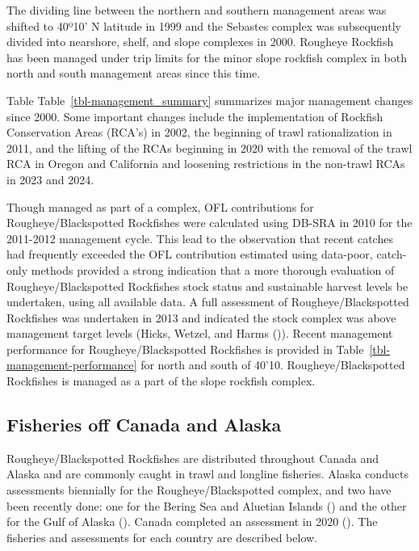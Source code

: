 \documentclass[
]{scrartcl}
\begin{document}
The dividing line between the northern and southern management areas was
shifted to 40º10' N latitude in 1999 and the Sebastes complex was
subsequently divided into nearshore, shelf, and slope complexes in 2000.
Rougheye Rockfish has been managed under trip limits for the minor slope
rockfish complex in both north and south management areas since this
time.

Table Table~\ref{tbl-management_summary} summarizes major management
changes since 2000. Some important changes include the implementation of
Rockfish Conservation Areas (RCA's) in 2002, the beginning of trawl
rationalization in 2011, and the lifting of the RCAs beginning in 2020
with the removal of the trawl RCA in Oregon and California and loosening
restrictions in the non-trawl RCAs in 2023 and 2024.

Though managed as part of a complex, OFL contributions for
Rougheye/Blackspotted Rockfishes were calculated using DB-SRA in 2010
for the 2011-2012 management cycle. This lead to the observation that
recent catches had frequently exceeded the OFL contribution estimated
using data-poor, catch-only methods provided a strong indication that a
more thorough evaluation of Rougheye/Blackspotted Rockfishes stock
status and sustainable harvest levels be undertaken, using all available
data. A full assessment of Rougheye/Blackspotted Rockfishes was
undertaken in 2013 and indicated the stock complex was above management
target levels (Hicks, Wetzel, and Harms
()). Recent management performance
for Rougheye/Blackspotted Rockfishes is provided in
Table~\ref{tbl-management-performance} for north and south of 40'10.
Rougheye/Blackspotted Rockfishes is managed as a part of the slope
rockfish complex.

\subsection{Fisheries off Canada and
Alaska}\label{fisheries-off-canada-and-alaska}

Rougheye/Blackspotted Rockfishes are distributed throughout Canada and
Alaska and are commonly caught in trawl and longline fisheries. Alaska
conducts assessments biennially for the Rougheye/Blackspotted complex,
and two have been recently done: one for the Bering Sea and Aluetian
Islands () and the other for the Gulf of Alaska
(). Canada
completed an assessment in 2020
().
The fisheries and assessments for each country are described below.
\end{document}
